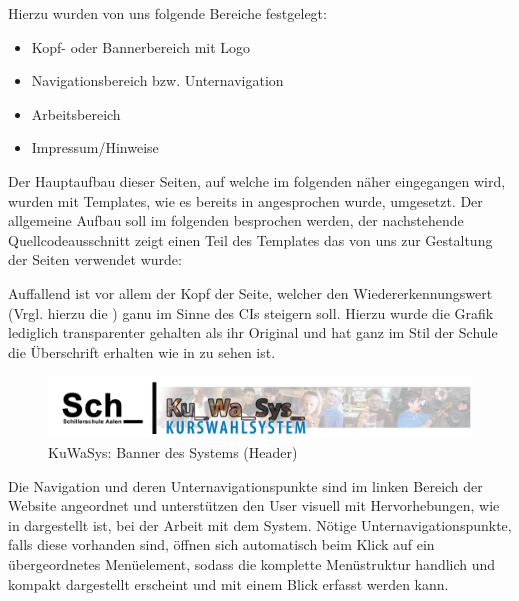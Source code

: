 Hierzu wurden von uns folgende Bereiche festgelegt:
\begin{itemize}
  \item Kopf- oder Bannerbereich mit Logo
  \item Navigationsbereich bzw. Unternavigation
  \item Arbeitsbereich
  \item Impressum/Hinweise
\end{itemize}

Der Hauptaufbau dieser Seiten, auf welche im folgenden näher eingegangen wird, wurden mit Templates, wie es bereits in  angesprochen wurde, umgesetzt.
Der allgemeine Aufbau soll im folgenden besprochen werden, der nachstehende Quellcodeausschnitt zeigt einen Teil des Templates das von uns zur Gestaltung der Seiten verwendet wurde:

	

Auffallend ist vor allem der Kopf der Seite, welcher den Wiedererkennungswert (Vrgl. hierzu die ) ganu im Sinne des \ac{CI}s steigern soll.
Hierzu wurde die Grafik lediglich transparenter gehalten als ihr Original und hat ganz im Stil der Schule die Überschrift erhalten wie in  zu sehen ist.

\begin{figure}[H]
 \begin{center}
   \includegraphics[scale=0.4]{img/header_KuWaSys.png}
 \end{center}
 \caption[\textbf{KuWaSys: Banner des Systems (Header)}]{KuWaSys: Banner des Systems (Header)}
 \label{fig:header_KuWaSys}
\end{figure}

Die Navigation und deren Unternavigationspunkte sind im linken Bereich der Website angeordnet und unterstützen den User visuell mit Hervorhebungen, wie in  dargestellt ist, bei der Arbeit mit dem System.
Nötige Unternavigationspunkte, falls diese vorhanden sind, öffnen sich automatisch beim Klick auf ein übergeordnetes Menüelement, sodass die komplette Menüstruktur handlich und kompakt dargestellt erscheint und mit einem Blick erfasst werden kann.

